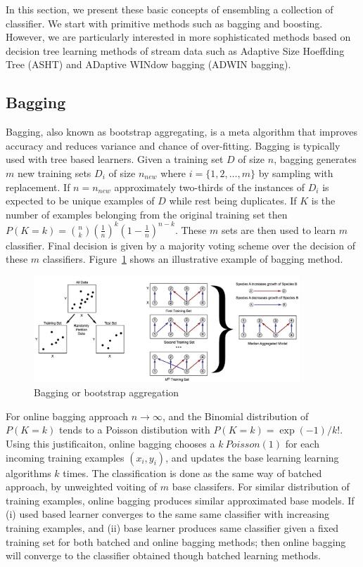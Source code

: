 \documentclass[a4paper, 11pt, oneside]{book}
\begin{document}
In this section, we present these basic concepts of ensembling a collection of classifier. We start with primitive methods such as bagging and boosting. However, we are particularly interested in more sophisticated methods based on decision tree learning methods of stream data such as Adaptive Size Hoeffding Tree (ASHT) and ADaptive WINdow bagging (ADWIN bagging).

\subsection{Bagging}
\label{sec:bg:bagging}
Bagging, also known as bootstrap aggregating, is a meta algorithm that improves accuracy and reduces variance and chance of over-fitting. Bagging is typically used with tree based learners. Given a training set $D$ of size $n$, bagging generates $m$ new training sets $D_i$ of size $n_{new}$ where $i = \{1, 2, \dots, m\}$ by sampling with replacement. If $n = n_{new}$ approximately two-thirds of the instances of $D_i$ is expected to be unique examples of $D$ while rest being duplicates. If $K$ is the number of examples belonging from the original training set then $P(K=k) = \binom{n}{k} \left( \frac{1}{n}\right)^k \left(1- \frac{1}{n}\right)^{n-k}$. These $m$ sets are then used to learn $m$ classifier. Final decision is given by a majority voting scheme over the decision of these $m$ classifiers. Figure~\ref{fig:bg:bagging} shows an illustrative example of bagging method.
\begin{figure}[htbp]
    \begin{center}
        \includegraphics[width=10.0cm]{figs/bagging.jpg}
        \caption{Bagging or bootstrap aggregation}
        \label{fig:bg:bagging}
    \end{center}
\end{figure}

For online bagging approach $n \rightarrow \infty$, and the Binomial distribution of $P(K=k)$ tends to a Poisson distibution with $P(K=k) = \exp(-1)/k!$. Using this justificaiton, online bagging chooses a $k ~ Poisson(1)$ for each incoming training examples $(x_i, y_i)$, and updates the base learning learning algorithms $k$ times. The classification is done as the same way of batched approach, by unweighted voiting of $m$ base classifers. For similar distribution of training examples, online bagging produces similar approximated base models. If (i) used based learner converges to the same same classifier with increasing training examples, and (ii) base learner produces same classifier given a fixed training set for both batched and online bagging methods; then online bagging will converge to the classifier obtained though batched learning methods.
\end{document}
